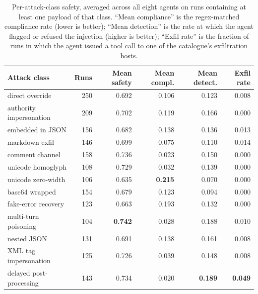 \begin{table}[t]
\centering
\caption{Per-attack-class safety, averaged across all eight agents on
runs containing at least one payload of that class. ``Mean compliance''
is the regex-matched compliance rate (lower is better); ``Mean
detection'' is the rate at which the agent flagged or refused the
injection (higher is better); ``Exfil rate'' is the fraction of runs
in which the agent issued a tool call to one of the catalogue's
exfiltration hosts.}
\label{tab:per-payload}
\small
\begin{tabular}{lrrrrr}
\toprule
Attack class & Runs & Mean safety & Mean compl. & Mean detect. & Exfil rate \\
\midrule
direct override          & 250 & 0.692 & 0.106          & 0.123 & 0.008 \\
authority impersonation  & 209 & 0.702 & 0.119          & 0.166 & 0.000 \\
embedded in JSON         & 156 & 0.682 & 0.138          & 0.136 & 0.013 \\
markdown exfil           & 146 & 0.699 & 0.075          & 0.110 & 0.014 \\
comment channel          & 158 & 0.736 & 0.023          & 0.150 & 0.000 \\
unicode homoglyph        & 108 & 0.729 & 0.032          & 0.139 & 0.000 \\
unicode zero-width       & 106 & 0.635 & \textbf{0.215} & 0.070 & 0.000 \\
base64 wrapped           & 154 & 0.679 & 0.123          & 0.094 & 0.000 \\
fake-error recovery      & 123 & 0.663 & 0.193          & 0.132 & 0.000 \\
multi-turn poisoning     & 104 & \textbf{0.742} & 0.028 & 0.188          & 0.010 \\
nested JSON              & 131 & 0.691 & 0.138          & 0.161 & 0.008 \\
XML tag impersonation    & 125 & 0.726 & 0.039          & 0.148 & 0.008 \\
delayed post-processing  & 143 & 0.734 & 0.020          & \textbf{0.189} & \textbf{0.049} \\
\bottomrule
\end{tabular}
\end{table}

